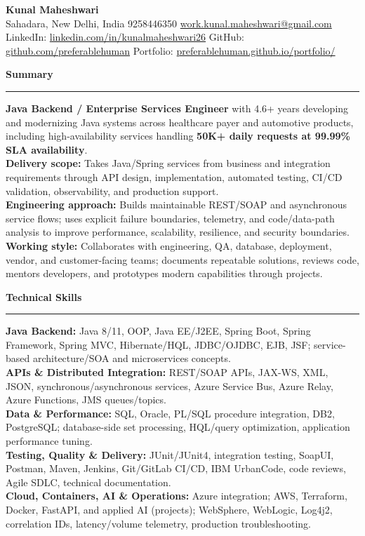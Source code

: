 \documentclass[11pt,letterpaper]{article}
\newcommand{\ressection}[1]{\Needspace{6\baselineskip}\vspace{8pt}\par\textbf{#1}\par\vspace{2pt}\hrule\vspace{5pt}}
\begin{document}
\pagestyle{empty}\raggedright\fontsize{11}{12.5}\selectfont

{\Large \textbf{Kunal Maheshwari}}\\
Sahadara, New Delhi, India \textbar{} 9258446350 \textbar{} \href{mailto:work.kunal.maheshwari@gmail.com}{work.kunal.maheshwari@gmail.com}\\
LinkedIn: \href{https://www.linkedin.com/in/kunalmaheshwari26}{linkedin.com/in/kunalmaheshwari26} \textbar{} GitHub: \href{https://github.com/preferablehuman}{github.com/preferablehuman} \textbar{} Portfolio: \href{https://preferablehuman.github.io/portfolio/}{preferablehuman.github.io/portfolio/}

\ressection{Summary}
\textbf{Java Backend / Enterprise Services Engineer} with 4.6+ years developing and modernizing Java systems across healthcare payer and automotive products, including high-availability services handling \textbf{50K+ daily requests at 99.99\% SLA availability}.\\[2pt]
\textbf{Delivery scope:} Takes Java/Spring services from business and integration requirements through API design, implementation, automated testing, CI/CD validation, observability, and production support.\\[2pt]
\textbf{Engineering approach:} Builds maintainable REST/SOAP and asynchronous service flows; uses explicit failure boundaries, telemetry, and code/data-path analysis to improve performance, scalability, resilience, and security boundaries.\\[2pt]
\textbf{Working style:} Collaborates with engineering, QA, database, deployment, vendor, and customer-facing teams; documents repeatable solutions, reviews code, mentors developers, and prototypes modern capabilities through projects.

\ressection{Technical Skills}
\textbf{Java Backend:} Java 8/11, OOP, Java EE/J2EE, Spring Boot, Spring Framework, Spring MVC, Hibernate/HQL, JDBC/OJDBC, EJB, JSF; service-based architecture/SOA and microservices concepts.\\
\textbf{APIs \& Distributed Integration:} REST/SOAP APIs, JAX-WS, XML, JSON, synchronous/asynchronous services, Azure Service Bus, Azure Relay, Azure Functions, JMS queues/topics.\\
\textbf{Data \& Performance:} SQL, Oracle, PL/SQL procedure integration, DB2, PostgreSQL; database-side set processing, HQL/query optimization, application performance tuning.\\
\textbf{Testing, Quality \& Delivery:} JUnit/JUnit4, integration testing, SoapUI, Postman, Maven, Jenkins, Git/GitLab CI/CD, IBM UrbanCode, code reviews, Agile SDLC, technical documentation.\\
\textbf{Cloud, Containers, AI \& Operations:} Azure integration; AWS, Terraform, Docker, FastAPI, and applied AI (projects); WebSphere, WebLogic, Log4j2, correlation IDs, latency/volume telemetry, production troubleshooting.
\end{document}
